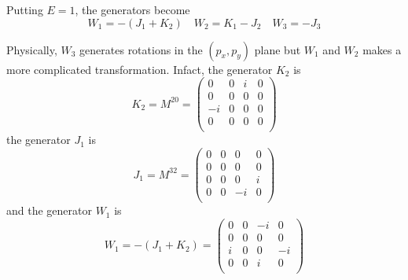    Putting $E = 1$, the generators become 
    \begin{equation*}
        W_1 = - (J_1 + K_2) \quad W_2 = K_1 - J_2 \quad W_3 = -J_3
    \end{equation*}

    Physically, $W_3$ generates rotations in the $(p_x, p_y)$ plane but $W_1$ and $W_2$ makes a more complicated transformation. Infact, the generator $K_2$ is
    \begin{equation*}
        K_2 = M^{20} = \begin{pmatrix}
            0 & 0 & i & 0 \\
            0 & 0 & 0 & 0 \\
            -i & 0 & 0 & 0 \\
            0 & 0 & 0 & 0 \\
        \end{pmatrix}
    \end{equation*}
    the generator $J_1$ is 
    \begin{equation*}
        J_1 = M^{32} = \begin{pmatrix}
            0 & 0 & 0 & 0 \\
            0 & 0 & 0 & 0 \\
            0 & 0 & 0 & i \\
            0 & 0 & -i & 0 \\
        \end{pmatrix}
    \end{equation*}
    and the generator $W_1$ is 
    \begin{equation*}
        W_1 = - (J_1 + K_2) = \begin{pmatrix}
            0 & 0 & -i & 0 \\
            0 & 0 & 0 & 0 \\
            i & 0 & 0 & -i \\
            0 & 0 & i & 0 \\
        \end{pmatrix}
    \end{equation*}

